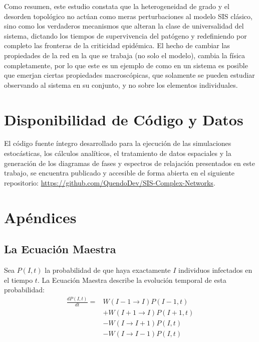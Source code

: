 \documentclass[%
reprint,
amsmath,amssymb,
aps,
]{revtex4-2}
\begin{document}
	Como resumen, este estudio constata que la heterogeneidad de grado y el desorden topológico no actúan como meras perturbaciones al modelo SIS clásico, sino como los verdaderos mecanismos que alteran la clase de universalidad del sistema, dictando los tiempos de supervivencia del patógeno y redefiniendo por completo las fronteras de la criticidad epidémica. El hecho de cambiar las propiedades de la red en la que se trabaja (no solo el modelo), cambia la física completamente, por lo que este es un ejemplo de como en un sistema es posible que emerjan ciertas propiedades macroscópicas, que solamente se pueden estudiar observando al sistema en su conjunto, y no sobre los elementos individuales.
	
	\section*{Disponibilidad de Código y Datos}
	El código fuente íntegro desarrollado para la ejecución de las simulaciones estocásticas, los cálculos analíticos, el tratamiento de datos espaciales y la generación de los diagramas de fases y espectros de relajación presentados en este trabajo, se encuentra publicado y accesible de forma abierta en el siguiente repositorio: \url{https://github.com/QuendoDev/SIS-Complex-Networks}.
	
	
	
	
	\section{Apéndices}
	\subsection{La Ecuación Maestra}\label{apendice:mean_field}
	
	Sea $P(I, t)$ la probabilidad de que haya exactamente $I$ individuos infectados en el tiempo $t$. La Ecuación Maestra describe la evolución temporal de esta probabilidad:
	\begin{equation}
		\begin{split}
			\frac{dP(I,t)}{dt} ={} & W(I-1 \to I)P(I-1,t) \\
			& + W(I+1 \to I)P(I+1,t) \\
			& - W(I \to I+1)P(I,t) \\
			& - W(I \to I-1)P(I,t)
		\end{split}
	\end{equation}
	
\end{document}
